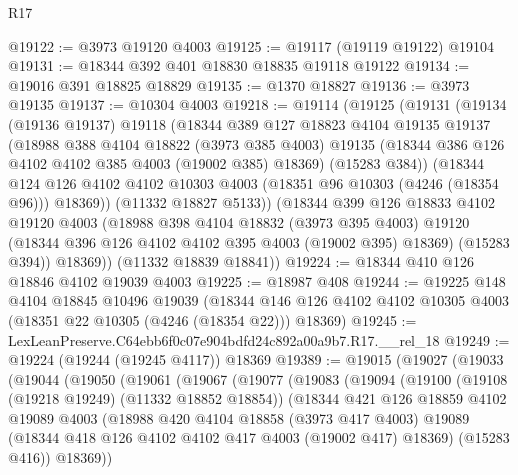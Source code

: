 \begin{lexlean}{R17}
\begin{coremodule}
@19122 := @3973 @19120 @4003
@19125 := @19117 (@19119 @19122) @19104
@19131 := @18344 @392 @401 @18830 @18835 @19118 @19122
@19134 := @19016 @391 @18825 @18829
@19135 := @1370 @18827
@19136 := @3973 @19135
@19137 := @10304 @4003
@19218 := @19114
    (@19125
      (@19131
        (@19134
          (@19136 @19137)
          @19118
          (@18344
            @389
            @127
            @18823
            @4104
            @19135
            @19137
            (@18988
              @388
              @4104
              @18822
              (@3973 @385 @4003)
              @19135
              (@18344 @386 @126 @4102 @4102 @385 @4003 (@19002 @385) @18369)
              (@15283 @384))
            (@18344
              @124
              @126
              @4102
              @4102
              @10303
              @4003
              (@18351 @96 @10303 (@4246 (@18354 @96)))
              @18369))
          (@11332 @18827 @5133))
        (@18344
          @399
          @126
          @18833
          @4102
          @19120
          @4003
          (@18988
            @398
            @4104
            @18832
            (@3973 @395 @4003)
            @19120
            (@18344 @396 @126 @4102 @4102 @395 @4003 (@19002 @395) @18369)
            (@15283 @394))
          @18369))
      (@11332 @18839 @18841))
@19224 := @18344 @410 @126 @18846 @4102 @19039 @4003
@19225 := @18987 @408
@19244 := @19225
    @148
    @4104
    @18845
    @10496
    @19039
    (@18344 @146 @126 @4102 @4102 @10305 @4003 (@18351 @22 @10305 (@4246 (@18354 @22))) @18369)
@19245 := LexLeanPreserve.C64ebb6f0c07e904bdfd24c892a00a9b7.R17.__rel_18
@19249 := @19224 (@19244 (@19245 @4117)) @18369
@19389 := @19015
    (@19027
      (@19033
        (@19044
          (@19050
            (@19061
              (@19067
                (@19077
                  (@19083
                    (@19094
                      (@19100
                        (@19108 (@19218 @19249) (@11332 @18852 @18854))
                        (@18344
                          @421
                          @126
                          @18859
                          @4102
                          @19089
                          @4003
                          (@18988
                            @420
                            @4104
                            @18858
                            (@3973 @417 @4003)
                            @19089
                            (@18344 @418 @126 @4102 @4102 @417 @4003 (@19002 @417) @18369)
                            (@15283 @416))
                          @18369))

\end{coremodule}
\end{lexlean}
